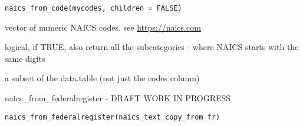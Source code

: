 \documentclass[a4paper]{book}
\begin{document}
%
\begin{Usage}
\begin{verbatim}
naics_from_code(mycodes, children = FALSE)
\end{verbatim}
\end{Usage}
%
\begin{Arguments}
\begin{ldescription}
\item[\code{mycodes}] vector of numeric NAICS codes. see \url{https://naics.com}

\item[\code{children}] logical, if TRUE, also return all the subcategories - where NAICS starts with the same digits
\end{ldescription}
\end{Arguments}
%
\begin{Value}
a subset of the  data.table (not just the codes column)
\end{Value}
%
\begin{SeeAlso}\relax
{}     
\end{SeeAlso}
%
\begin{Description}\relax
naics\_from\_federalregister - DRAFT WORK IN PROGRESS
\end{Description}
%
\begin{Usage}
\begin{verbatim}
naics_from_federalregister(naics_text_copy_from_fr)
\end{verbatim}
\end{Usage}
%
\begin{Arguments}
\begin{ldescription}
\item[\code{naics\_text\_copy\_from\_fr}] 
\end{ldescription}
\end{Arguments}
%
\end{document}
